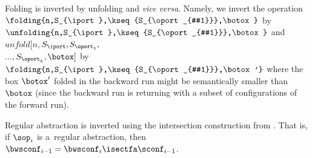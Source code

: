 \sloppy Folding is inverted by unfolding and \emph{vice versa}. Namely, 
we invert the operation $\folding{n,S_{\iport},\kseq{S_{\oport_{#1}}},\botox}$ by 
$\unfolding{n,S_{\iport},\kseq{S_{\oport_{#1}}},\botox}$ and
$\mathit{unfold}$$[n,$$S_{\iport},$$S_{\oport_{1}},$\\$\ldots,$$S_{\oport_{k}},$$\botox]$ by
$\folding{n,S_{\iport},\kseq{S_{\oport_{#1}}},\botox'}$ where the box $\botox'$ folded in
the backward run might be semantically smaller than $\botox$ (since the
backward run is returning with a subset of configurations of the forward run). 

Regular abstraction is inverted using the intersection construction from . 
That is, if $\sop_i$ is a~regular abstraction, 
then $\bwsconf_{i-1} = \bwsconf_{i} \isectfa\sconf_{i-1}$.

